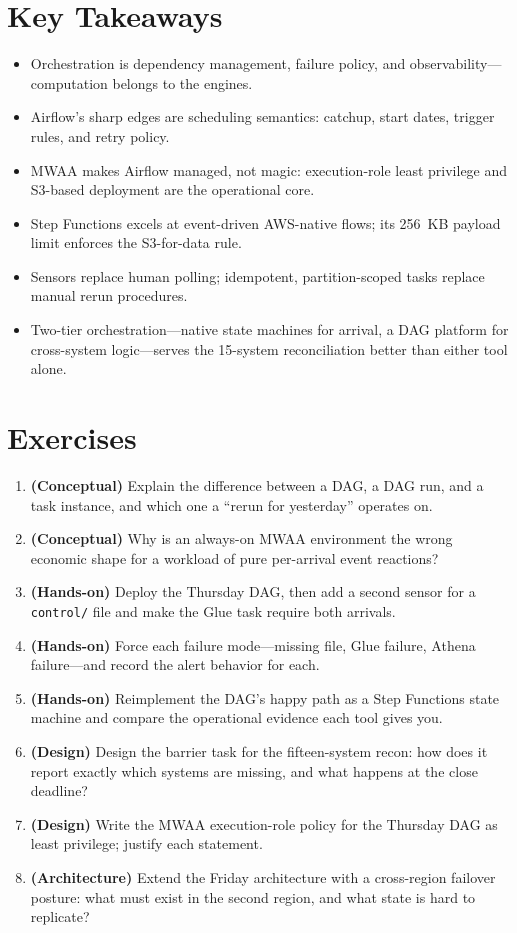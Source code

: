 \section*{Key Takeaways}
\begin{itemize}
    \item Orchestration is dependency management, failure policy, and observability---computation belongs to the engines.
    \item Airflow's sharp edges are scheduling semantics: catchup, start dates, trigger rules, and retry policy.
    \item MWAA makes Airflow managed, not magic: execution-role least privilege and S3-based deployment are the operational core.
    \item Step Functions excels at event-driven AWS-native flows; its 256~KB payload limit enforces the S3-for-data rule.
    \item Sensors replace human polling; idempotent, partition-scoped tasks replace manual rerun procedures.
    \item Two-tier orchestration---native state machines for arrival, a DAG platform for cross-system logic---serves the 15-system reconciliation better than either tool alone.
\end{itemize}

\section{Exercises}
\begin{enumerate}
    \item \textbf{(Conceptual)} Explain the difference between a DAG, a DAG run, and a task instance, and which one a ``rerun for yesterday'' operates on.
    \item \textbf{(Conceptual)} Why is an always-on MWAA environment the wrong economic shape for a workload of pure per-arrival event reactions?
    \item \textbf{(Hands-on)} Deploy the Thursday DAG, then add a second sensor for a \texttt{control/} file and make the Glue task require both arrivals.
    \item \textbf{(Hands-on)} Force each failure mode---missing file, Glue failure, Athena failure---and record the alert behavior for each.
    \item \textbf{(Hands-on)} Reimplement the DAG's happy path as a Step Functions state machine and compare the operational evidence each tool gives you.
    \item \textbf{(Design)} Design the barrier task for the fifteen-system recon: how does it report exactly which systems are missing, and what happens at the close deadline?
    \item \textbf{(Design)} Write the MWAA execution-role policy for the Thursday DAG as least privilege; justify each statement.
    \item \textbf{(Architecture)} Extend the Friday architecture with a cross-region failover posture: what must exist in the second region, and what state is hard to replicate?
\end{enumerate}

